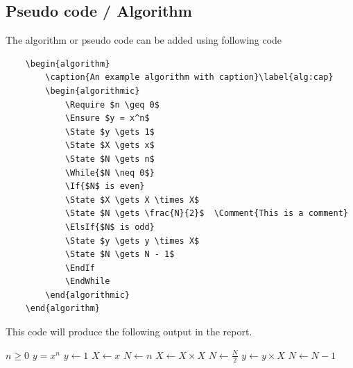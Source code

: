 \subsection{Pseudo code / Algorithm}
\label{subsec:latex-algorithms}
The algorithm or pseudo code can be added using following code
\begin{verbatim}
	\begin{algorithm}
		\caption{An example algorithm with caption}\label{alg:cap}
		\begin{algorithmic}
			\Require $n \geq 0$
			\Ensure $y = x^n$
			\State $y \gets 1$
			\State $X \gets x$
			\State $N \gets n$
			\While{$N \neq 0$}
			\If{$N$ is even}
			\State $X \gets X \times X$
			\State $N \gets \frac{N}{2}$  \Comment{This is a comment}
			\ElsIf{$N$ is odd}
			\State $y \gets y \times X$
			\State $N \gets N - 1$
			\EndIf
			\EndWhile
		\end{algorithmic}
	\end{algorithm}
\end{verbatim}
This code will produce the following output in the report.
\begin{algorithm}
	\caption{An example algorithm with caption}\label{alg:cap}
	\begin{algorithmic}
		\Require $n \geq 0$
		\Ensure $y = x^n$
		\State $y \gets 1$
		\State $X \gets x$
		\State $N \gets n$
		\State $X \gets X \times X$
		\State $N \gets \frac{N}{2}$  
		\State $y \gets y \times X$
		\State $N \gets N - 1$
		\EndIf
		\EndWhile
	\end{algorithmic}
\end{algorithm}
